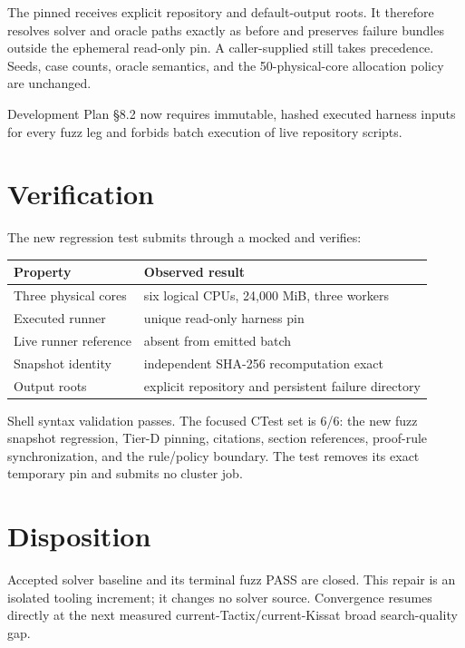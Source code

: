 \documentclass[11pt]{article}
\newcommand{\code}[1]{\texttt{\detokenize{#1}}}
\begin{document}
The pinned \code{run.sh} receives explicit repository and default-output roots.
It therefore resolves solver and oracle paths exactly as before and preserves
failure bundles outside the ephemeral read-only pin.  A caller-supplied
\code{--outdir} still takes precedence.  Seeds, case counts, oracle semantics,
and the 50-physical-core allocation policy are unchanged.

Development Plan \S8.2 now requires immutable, hashed executed harness inputs
for every fuzz leg and forbids batch execution of live repository scripts.

\section{Verification}
The new regression test submits through a mocked \code{sbatch} and verifies:

\begin{center}
\begin{tabular}{ll}
\toprule
Property & Observed result \\
\midrule
Three physical cores & six logical CPUs, 24,000 MiB, three workers \\
Executed runner & unique read-only harness pin \\
Live runner reference & absent from emitted batch \\
Snapshot identity & independent SHA-256 recomputation exact \\
Output roots & explicit repository and persistent failure directory \\
\bottomrule
\end{tabular}
\end{center}

Shell syntax validation passes.  The focused CTest set is 6/6: the new fuzz
snapshot regression, Tier-D pinning, citations, section references,
proof-rule synchronization, and the rule/policy boundary.  The test removes
its exact temporary pin and submits no cluster job.

\section{Disposition}
Accepted solver baseline \code{16d46d5} and its terminal fuzz PASS are closed.
This repair is an isolated tooling increment; it changes no solver source.
Convergence resumes directly at the next measured current-Tactix/current-Kissat
broad search-quality gap.
\end{document}
